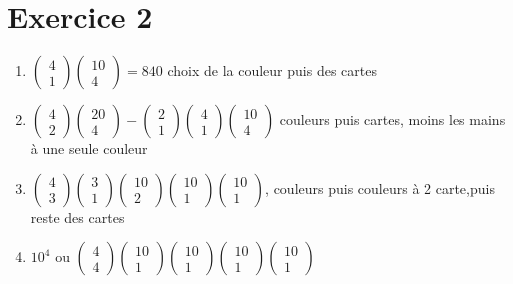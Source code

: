 \documentclass[fontsize=10pt]{article}
\begin{document}
\section*{Exercice 2}
\begin{enumerate}
\item $\begin{pmatrix} 
4\\
1
\end{pmatrix}
\begin{pmatrix} 
10\\
4
\end{pmatrix} = 840$ choix de la couleur puis des cartes
\item$\begin{pmatrix} 
4\\
2
\end{pmatrix}
\begin{pmatrix} 
20\\
4
\end{pmatrix} -
\begin{pmatrix} 
2\\
1
\end{pmatrix}
\begin{pmatrix} 
4\\
1
\end{pmatrix}
\begin{pmatrix} 
10\\
4
\end{pmatrix}$ couleurs puis cartes, moins les mains à une seule couleur
\item $
\begin{pmatrix} 
4\\
3
\end{pmatrix}
\begin{pmatrix} 
3\\
1
\end{pmatrix}
\begin{pmatrix} 
10\\
2
\end{pmatrix}
\begin{pmatrix} 
10\\
1
\end{pmatrix}
\begin{pmatrix} 
10\\
1
\end{pmatrix}$, couleurs puis couleurs à 2 carte,puis reste des cartes
\item $10^4$ ou $
\begin{pmatrix} 
4\\
4
\end{pmatrix}
\begin{pmatrix} 
10\\
1
\end{pmatrix}
\begin{pmatrix} 
10\\
1
\end{pmatrix}
\begin{pmatrix} 
10\\
1
\end{pmatrix}
\begin{pmatrix} 
10\\
1
\end{pmatrix}$
\end{enumerate}
\end{document}
